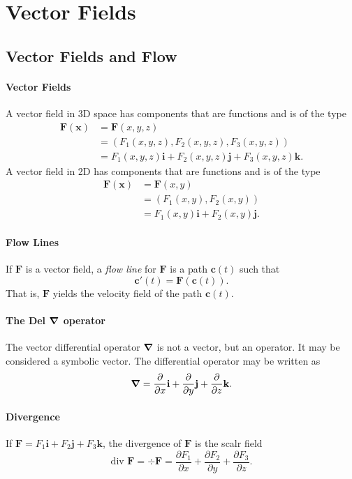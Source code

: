 
\section{Vector Fields}
\subsection{Vector Fields and Flow}
\paragraph{Vector Fields}
A vector field in 3D space has components that are functions and is of the type 
\begin{align*}
    \textbf{F}(\textbf{x}) & = \textbf{F}(x,y,z) \\
    & = (F_1(x,y,z), F_2(x,y,z), F_3(x,y,z)) \\
    & = F_1(x,y,z)\textbf{i} + F_2(x,y,z)\textbf{j} + F_3(x,y,z)\textbf{k}.
\end{align*}
A vector field in 2D has components that are functions and is of the type 
\begin{align*}
    \textbf{F}(\textbf{x}) & = \textbf{F}(x,y) \\
    & = (F_1(x,y), F_2(x,y)) \\
    & = F_1(x,y)\textbf{i} + F_2(x,y)\textbf{j}.
\end{align*}

\paragraph{Flow Lines}
If \(\textbf{F}\) is a vector field, a \textit{flow line} for \(\textbf{F}\) is a path \(\textbf{c}(t)\) such that 
\[\textbf{c}'(t) = \textbf{F}(\textbf{c}(t)).\]
That is, \(\textbf{F}\) yields the velocity field of the path \(\textbf{c}(t)\).

\paragraph{The Del \(\grad\) operator}
The vector differential operator \(\grad\) is not a vector, but an operator. It may be considered a symbolic vector. The differential operator may be written as 
\[\grad = \frac{\partial}{\partial x}\textbf{i} + \frac{\partial}{\partial y}\textbf{j} + \frac{\partial}{\partial z}\textbf{k}.\]

\paragraph{Divergence}
If \(\textbf{F} = F_1\textbf{i} + F_2\textbf{j} + F_3\textbf{k}\), the divergence of \(\textbf{F}\) is the scalr field
\[\text{div }\textbf{F} = \div \textbf{F} = \frac{\partial F_1}{\partial x} + \frac{\partial F_2}{\partial y} + \frac{\partial F_3}{\partial z}.\]

